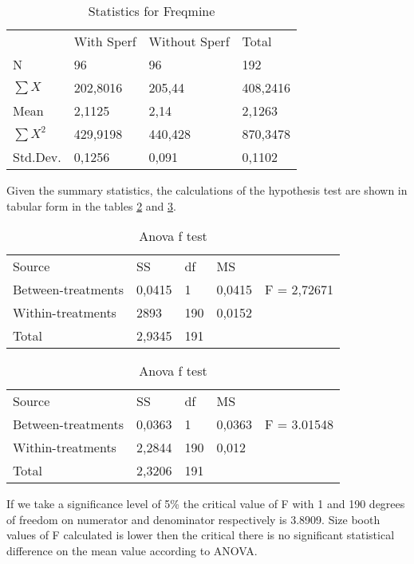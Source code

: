 \begin{table}[H]
	\centering
	\caption{Statistics for Freqmine}
	\label{tab:freqstatistics}
	\begin{tabular}{llll}
		& With Sperf & Without Sperf & Total    \\
		N           & 96         & 96            & 192      \\
		$\sum{X}$   & 202,8016   & 205,44        & 408,2416 \\
		Mean        & 2,1125     & 2,14          & 2,1263   \\
		$\sum{X^2}$ & 429,9198   & 440,428       & 870,3478 \\
		Std.Dev.    & 0,1256     & 0,091         & 0,1102  
	\end{tabular}
\end{table}

Given the summary statistics, the calculations of the hypothesis test are shown in tabular form in the tables \ref{tab:blackAnova} and \ref{tab:freqsAnova}.

\begin{table}[H]
	\centering
	\caption{Anova f test}
	\label{tab:blackAnova}
	\begin{tabular}{lllll}
		Source             & SS     & df  & MS     &             \\
		Between-treatments & 0,0415 & 1   & 0,0415 & F = 2,72671 \\
		Within-treatments  & 2893   & 190 & 0,0152 &             \\
		Total              & 2,9345 & 191 &        &            
	\end{tabular}
\end{table}

\begin{table}[H]
	\centering
	\caption{Anova f test}
	\label{tab:freqsAnova}
	\begin{tabular}{lllll}
		Source             & SS     & df  & MS     &             \\
		Between-treatments & 0,0363 & 1   & 0,0363 & F = 3.01548 \\
		Within-treatments  & 2,2844 & 190 & 0,012  &             \\
		Total              & 2,3206 & 191 &        &            
	\end{tabular}
\end{table}

If we take a significance level of 5\% the critical value of F with 1 and 190 degrees of freedom on numerator and denominator respectively is 3.8909. Size booth values of F calculated is lower then the critical there is no significant statistical difference on the mean value according to ANOVA.

